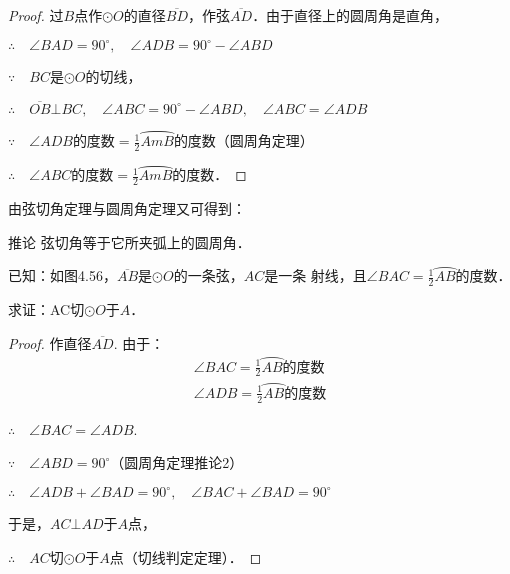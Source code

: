   \begin{proof}
  过$B$点作$\odot O$的直径$\overline{BD}$，作弦$\overline{AD}$．由于直径上的圆周角是直角，
  
  $\therefore\quad \angle BAD=90^{\circ},\quad \angle ADB=90^{\circ}-\angle ABD$
  
  $\because\quad BC$是$\odot O$的切线，
  
  $\therefore\quad \overline{OB}\bot BC,\quad \angle ABC=90^{\circ}-\angle ABD,\quad \angle ABC=\angle ADB$
  
  $\because\quad \angle ADB$的度数$=\frac{1}{2}\wideparen{AmB}$的度数（圆周角定理）
  
  $\therefore\quad \angle ABC$的度数$=\frac{1}{2}\wideparen{AmB}$的度数．
  \end{proof}
  
    由弦切角定理与圆周角定理又可得到：
    
  \begin{blk}
    {推论} 弦切角等于它所夹弧上的圆周角．
  \end{blk}
  
  \begin{example}
    已知：如图4.56，$\overline{AB}$是$\odot O$的一条弦，$AC$是一条
    射线，且$\angle BAC=\frac{1}{2}\wideparen{AB}$的度数．
  
    求证：AC切$\odot O$于$A$．
  \end{example}
  
  \begin{proof}
  作直径$\overline{AD}$. 由于：
  \begin{align*}
    \angle BAC=\frac{1}{2}\wideparen{AB}\text{的度数}\tag{已知}\\
    \angle ADB=\frac{1}{2}\wideparen{AB}\text{的度数}\tag{圆周角定理}
  \end{align*}
  
  $\therefore\quad \angle BAC = \angle ADB$.
  
  $\because\quad \angle ABD=90^{\circ}$（圆周角定理推论2）
  
  $\therefore\quad \angle ADB+\angle BAD=90^{\circ},\quad \angle BAC+\angle BAD=90^{\circ}$
  
  于是，$AC\bot AD$于$A$点，
  
  $\therefore\quad AC$切$\odot O$于$A$点（切线判定定理）．  
  \end{proof}
  
